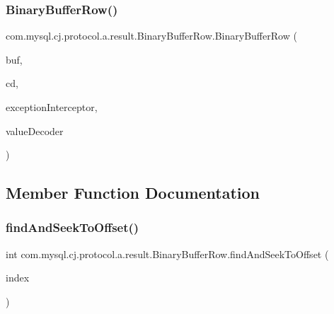 \subsubsection{\texorpdfstring{Binary\+Buffer\+Row()}{BinaryBufferRow()}}
{\footnotesize\ttfamily com.\+mysql.\+cj.\+protocol.\+a.\+result.\+Binary\+Buffer\+Row.\+Binary\+Buffer\+Row (\begin{DoxyParamCaption}\item[{\mbox{\hyperlink{classcom_1_1mysql_1_1cj_1_1protocol_1_1a_1_1_native_packet_payload}{Native\+Packet\+Payload}}}]{buf,  }\item[{\mbox{\hyperlink{interfacecom_1_1mysql_1_1cj_1_1protocol_1_1_column_definition}{Column\+Definition}}}]{cd,  }\item[{\mbox{\hyperlink{interfacecom_1_1mysql_1_1cj_1_1exceptions_1_1_exception_interceptor}{Exception\+Interceptor}}}]{exception\+Interceptor,  }\item[{\mbox{\hyperlink{interfacecom_1_1mysql_1_1cj_1_1protocol_1_1_value_decoder}{Value\+Decoder}}}]{value\+Decoder }\end{DoxyParamCaption})}



\subsection{Member Function Documentation}
\mbox{\label{classcom_1_1mysql_1_1cj_1_1protocol_1_1a_1_1result_1_1_binary_buffer_row_a5b8c0028ba6d68556a027d0d6cdf96aa}} 
\subsubsection{\texorpdfstring{find\+And\+Seek\+To\+Offset()}{findAndSeekToOffset()}}
{\footnotesize\ttfamily int com.\+mysql.\+cj.\+protocol.\+a.\+result.\+Binary\+Buffer\+Row.\+find\+And\+Seek\+To\+Offset (\begin{DoxyParamCaption}\item[{int}]{index }\end{DoxyParamCaption})\hspace{0.3cm}{\ttfamily [protected]}}

